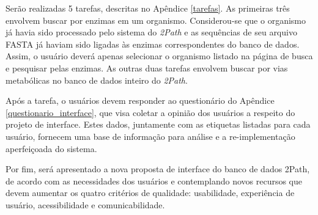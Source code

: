\indent Serão realizadas 5 tarefas, descritas no Apêndice \ref{tarefas}. As primeiras três envolvem buscar por enzimas em um organismo. Considerou-se que o organismo já havia sido processado pelo sistema do \textit{2Path} e as sequências de seu arquivo FASTA já haviam sido ligadas às enzimas correspondentes do banco de dados. Assim, o usuário deverá apenas selecionar o organismo listado na página de busca e pesquisar pelas enzimas. As outras duas tarefas envolvem buscar por vias metabólicas no banco de dados inteiro do \textit{2Path}.

\indent Após a tarefa, o usuários devem responder ao questionário do Apêndice \ref{questionario_interface}, que visa coletar a opinião dos usuários a respeito do projeto de interface. Estes dados, juntamente com as etiquetas listadas para cada usuário, fornecem uma base de informação para análise e a re-implementação aperfeiçoada do sistema.

\indent Por fim, será apresentado a nova proposta de interface do banco de dados 2Path, de acordo com as necessidades dos usuários e contemplando novos recursos que devem aumentar os quatro critérios de qualidade: usabilidade, experiência de usuário, acessibilidade e comunicabilidade.
